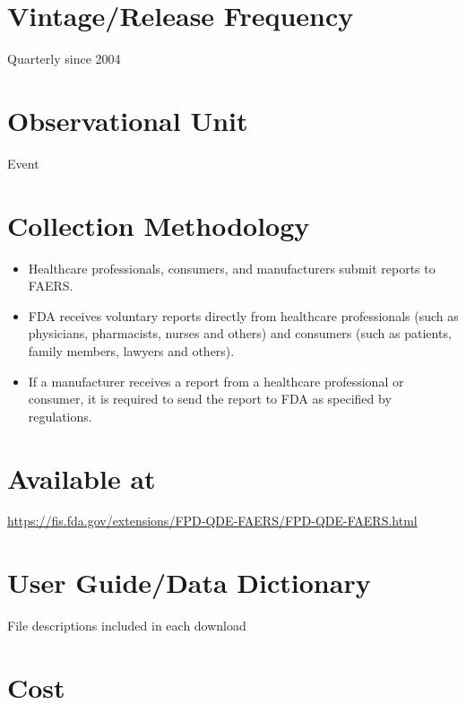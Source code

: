 \documentclass[
]{book}
\providecommand{\tightlist}{%
  \setlength{\itemsep}{0pt}\setlength{\parskip}{0pt}}
\begin{document}
\hypertarget{vintagerelease-frequency-24}{%
\section{Vintage/Release Frequency}\label{vintagerelease-frequency-24}}

Quarterly since 2004

\hypertarget{observational-unit-24}{%
\section{Observational Unit}\label{observational-unit-24}}

Event

\hypertarget{collection-methodology-24}{%
\section{Collection Methodology}\label{collection-methodology-24}}

\begin{itemize}
\tightlist
\item
  Healthcare professionals, consumers, and manufacturers submit reports to FAERS.
\item
  FDA receives voluntary reports directly from healthcare professionals (such as physicians, pharmacists, nurses and others) and consumers (such as patients, family members, lawyers and others).
\item
  If a manufacturer receives a report from a healthcare professional or consumer, it is required to send the report to FDA as specified by regulations.
\end{itemize}

\hypertarget{available-at-24}{%
\section{Available at}\label{available-at-24}}

\url{https://fis.fda.gov/extensions/FPD-QDE-FAERS/FPD-QDE-FAERS.html}

\hypertarget{user-guidedata-dictionary-24}{%
\section{User Guide/Data Dictionary}\label{user-guidedata-dictionary-24}}

File descriptions included in each download

\hypertarget{cost-24}{%
\section{Cost}\label{cost-24}}
\end{document}
